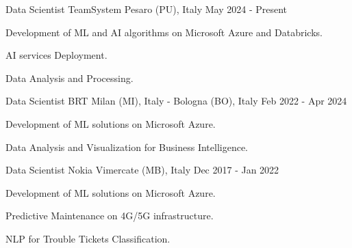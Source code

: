 

\begin{cventries}

  \cventry
    {Data Scientist} %
    {TeamSystem} %
    {Pesaro (PU), Italy} %
    {May 2024 - Present} %
    {
      \begin{cvitems} %
        \item {Development of ML and AI algorithms on Microsoft Azure and Databricks.}
        \item {AI services Deployment.}
        \item {Data Analysis and Processing.}
      \end{cvitems}
    }

  \cventry
    {Data Scientist} %
    {BRT} %
    {Milan (MI), Italy - Bologna (BO), Italy} %
    {Feb 2022 - Apr 2024} %
    {
      \begin{cvitems} %
        \item {Development of ML solutions on Microsoft Azure.}
        \item {Data Analysis and Visualization for Business Intelligence.}
      \end{cvitems}
    }

  \cventry
    {Data Scientist} %
    {Nokia} %
    {Vimercate (MB), Italy} %
    {Dec 2017 - Jan 2022} %
    {
     \begin{cvitems} %
        \item {Development of ML solutions on Microsoft Azure.}
        \item {Predictive Maintenance on 4G/5G infrastructure.}
        \item {NLP for Trouble Tickets Classification.}
      \end{cvitems}
    }


\end{cventries}
